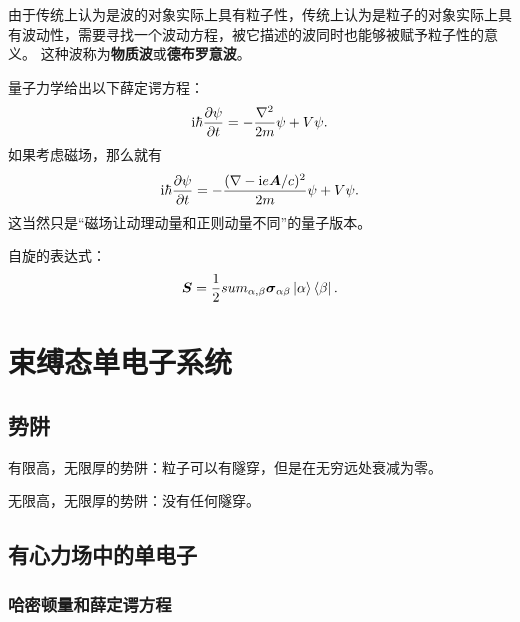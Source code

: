 \documentclass[UTF8, a4paper]{ctexart}
\newcommand*{\ii}{\mathrm{i}}
\begin{document}
由于传统上认为是波的对象实际上具有粒子性，传统上认为是粒子的对象实际上具有波动性，需要寻找一个波动方程，被它描述的波同时也能够被赋予粒子性的意义。
这种波称为\textbf{物质波}或\textbf{德布罗意波}。

量子力学给出以下薛定谔方程：
\begin{equation}
    \ii \hbar \pdv{\psi}{t} = - \frac{\laplacian}{2m} \psi + V \psi.
\end{equation}
如果考虑磁场，那么就有
\begin{equation}
    \ii \hbar \pdv{\psi}{t} = - \frac{(\nabla - \ii e \vb*{A}/c)^2}{2m} \psi + V \psi.
\end{equation}
这当然只是“磁场让动理动量和正则动量不同”的量子版本。

自旋的表达式：
\begin{equation}
    \vb*{S} = \frac{1}{2} sum_{\alpha, \beta} \vb*{\sigma}_{\alpha \beta} \ket{\alpha} \bra{\beta}.
\end{equation}

\section{束缚态单电子系统}

\subsection{势阱}

有限高，无限厚的势阱：粒子可以有隧穿，但是在无穷远处衰减为零。

无限高，无限厚的势阱：没有任何隧穿。

\subsection{有心力场中的单电子}

\subsubsection{哈密顿量和薛定谔方程}
\end{document}
